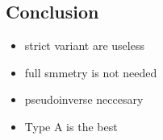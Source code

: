 





\subsection{Conclusion}

\begin{itemize}
    \item strict variant are useless 
    \item full smmetry is not needed
    \item pseudoinverse neccesary
    \item Type A is the best
\end{itemize}
